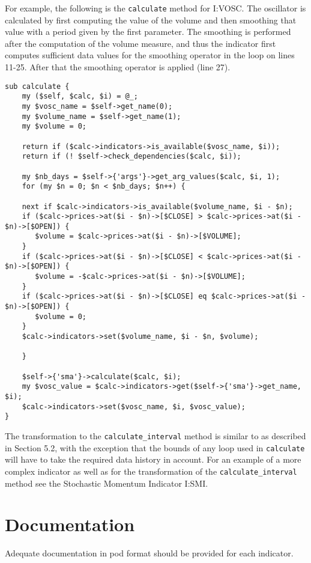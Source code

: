 \documentclass[11pt,twoside]{article}
\begin{document}
For example, the following is the \lstinline!calculate! method
for I:VOSC. The oscillator is calculated by first computing the value
of the volume and then smoothing that value with a period given by the
first parameter. The smoothing is performed after the computation of
the volume measure, and thus the indicator first computes sufficient
data values for the smoothing operator in the loop on lines 11-25.
After that the smoothing operator is applied (line 27).

\begin{lstlisting}[numbers=none]
sub calculate {
    my ($self, $calc, $i) = @_;
    my $vosc_name = $self->get_name(0);
    my $volume_name = $self->get_name(1);
    my $volume = 0;

    return if ($calc->indicators->is_available($vosc_name, $i));
    return if (! $self->check_dependencies($calc, $i));

    my $nb_days = $self->{'args'}->get_arg_values($calc, $i, 1);
    for (my $n = 0; $n < $nb_days; $n++) {

    next if $calc->indicators->is_available($volume_name, $i - $n);
    if ($calc->prices->at($i - $n)->[$CLOSE] > $calc->prices->at($i - $n)->[$OPEN]) {
       $volume = $calc->prices->at($i - $n)->[$VOLUME];
    }
    if ($calc->prices->at($i - $n)->[$CLOSE] < $calc->prices->at($i - $n)->[$OPEN]) {
       $volume = -$calc->prices->at($i - $n)->[$VOLUME];
    }
    if ($calc->prices->at($i - $n)->[$CLOSE] eq $calc->prices->at($i - $n)->[$OPEN]) {
       $volume = 0;
    }
    $calc->indicators->set($volume_name, $i - $n, $volume);

    }

    $self->{'sma'}->calculate($calc, $i);
    my $vosc_value = $calc->indicators->get($self->{'sma'}->get_name, $i);
    $calc->indicators->set($vosc_name, $i, $vosc_value);
}
\end{lstlisting}
The transformation to the \lstinline!calculate_interval! method
is similar to as described in Section 5.2, with the exception that the
bounds of any loop used in \lstinline!calculate! will have to
take the required data history in account. For an example of a more
complex indicator as well as for the transformation of the
\lstinline!calculate_interval! method see the Stochastic
Momentum Indicator I:SMI.

\section{Documentation}
Adequate documentation in pod format should be provided for each
indicator.

\end{document}
